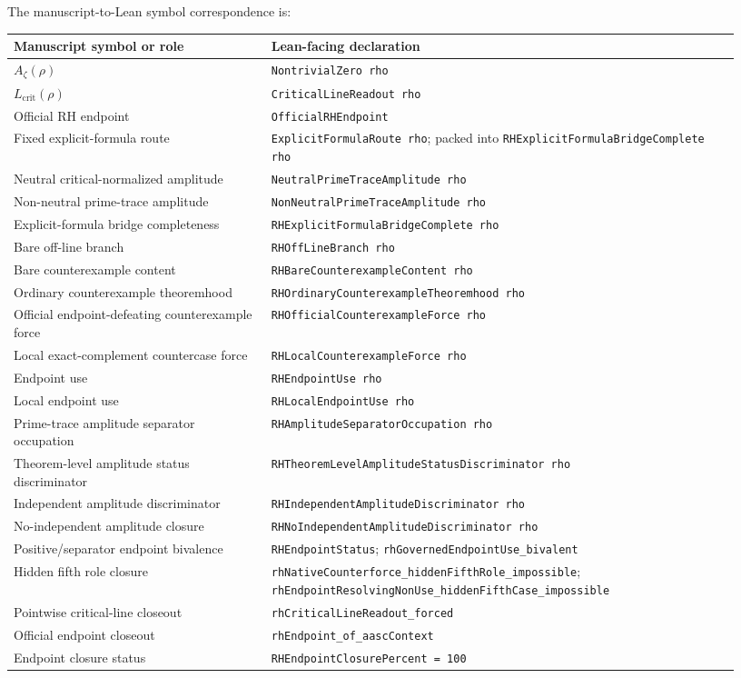 \documentclass[11pt]{article}
\newcommand{\Az}{A_{\zeta}}
\newcommand{\Lcrit}{L_{\mathrm{crit}}}
\begin{document}
The manuscript-to-Lean symbol correspondence is:
\begin{longtable}{@{}L{0.33\linewidth}L{0.60\linewidth}@{}}
\toprule
Manuscript symbol or role & Lean-facing declaration \\
\midrule
\(\Az(\rho)\) & \texttt{NontrivialZero rho} \\
\(\Lcrit(\rho)\) & \texttt{CriticalLineReadout rho} \\
Official RH endpoint & \texttt{OfficialRHEndpoint} \\
Fixed explicit-formula route & \texttt{ExplicitFormulaRoute rho}; packed into \texttt{RHExplicitFormulaBridgeComplete rho} \\
Neutral critical-normalized amplitude & \texttt{NeutralPrimeTraceAmplitude rho} \\
Non-neutral prime-trace amplitude & \texttt{NonNeutralPrimeTraceAmplitude rho} \\
Explicit-formula bridge completeness & \texttt{RHExplicitFormulaBridgeComplete rho} \\
Bare off-line branch & \texttt{RHOffLineBranch rho} \\
Bare counterexample content & \texttt{RHBareCounterexampleContent rho} \\
Ordinary counterexample theoremhood & \texttt{RHOrdinaryCounterexampleTheoremhood rho} \\
Official endpoint-defeating counterexample force & \texttt{RHOfficialCounterexampleForce rho} \\
Local exact-complement countercase force & \texttt{RHLocalCounterexampleForce rho} \\
Endpoint use & \texttt{RHEndpointUse rho} \\
Local endpoint use & \texttt{RHLocalEndpointUse rho} \\
Prime-trace amplitude separator occupation & \texttt{RHAmplitudeSeparatorOccupation rho} \\
Theorem-level amplitude status discriminator & \texttt{RHTheoremLevelAmplitudeStatusDiscriminator rho} \\
Independent amplitude discriminator & \texttt{RHIndependentAmplitudeDiscriminator rho} \\
No-independent amplitude closure & \texttt{RHNoIndependentAmplitudeDiscriminator rho} \\
Positive/separator endpoint bivalence & \texttt{RHEndpointStatus}; \texttt{rhGovernedEndpointUse\_bivalent} \\
Hidden fifth role closure & \texttt{rhNativeCounterforce\_hiddenFifthRole\_impossible}; \texttt{rhEndpointResolvingNonUse\_hiddenFifthCase\_impossible} \\
Pointwise critical-line closeout & \texttt{rhCriticalLineReadout\_forced} \\
Official endpoint closeout & \texttt{rhEndpoint\_of\_aascContext} \\
Endpoint closure status & \texttt{RHEndpointClosurePercent = 100} \\
\bottomrule
\end{longtable}
\end{document}
